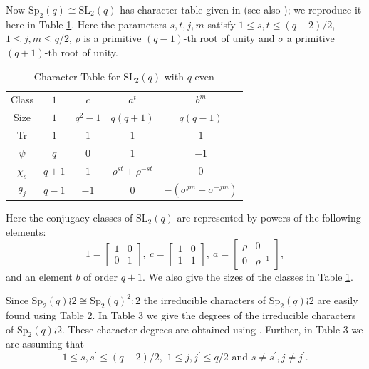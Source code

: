\documentclass[10pt,a4paper]{amsart}
\theoremstyle{plain}
\theoremstyle{definition}
\numberwithin{equation}{section}
\begin{document}
Now $\mathrm{Sp}_{2}(q) \cong \mathrm{SL}_2(q)$ has  character table  given in \cite{Dor}  (see also  \cite {GH}); we reproduce it here in Table \ref{sleven}.
Here the parameters $s,t,j,m$ satisfy $1\leq s, t \leq (q-2)/2$, $1\leq j, m \leq q/2$,  $\rho$ is a primitive $(q-1)$-th root of unity and $\sigma$ a primitive $(q+1)$-th root of unity. 

\begin{table}[h!]
\centering
\caption{Character Table for $\mathrm{SL}_{2}(q)$ with $q$ even}
\label{sleven}
\vspace{5pt}
\begin{tabular}{c|cccc}
Class & $1$ & $c$ & $a^t$ & $b^m$\\
Size & $1$ & $q^2-1$ & $q(q+1)$ & $q(q-1)$\\
\hline
 Tr & $1$ & $1$ & $1$ & $1$\\
$\psi$ & $q$ & $0$ & $1$ & $-1$\\
$\chi_s$ & $q+1$ & $1$ & $\rho^{st}+\rho^{-st}$ & $0$\\
$\theta_j$ & $q-1$ & $-1$ & $0$ & $-(\sigma^{jm}+\sigma^{-jm})$\\
\end{tabular}
\end{table}

Here the conjugacy classes of SL$_2(q)$ are represented by powers of the following elements:
$$
1 = \begin{bmatrix}
1 & 0\\
0 & 1
\end{bmatrix},\ 
c=\begin{bmatrix}
1 & 0\\
1 & 1
\end{bmatrix},\ 
a=\begin{bmatrix}
\rho & 0\\
0 & \rho^{-1}
\end{bmatrix},
$$
and an element $b$ of order $q+1$. We also give the sizes of the classes in Table \ref{sleven}.

Since $\mathrm{Sp}_2(q)\wr 2 \cong \mathrm{Sp}_2(q)^2\colon 2$
  the irreducible characters of $\mathrm{Sp}_2(q)\wr 2$ are easily found using Table 2.
In Table 
   3 we give the degrees of the irreducible characters of $\mathrm{Sp}_2(q)\wr 2$.
These character degrees are obtained using \cite[Proposition $20.9$, Theorem $19.18$]{JaL}. Further, in Table 
 3 we are assuming that  
 $$1 \leq s, s^\prime \leq (q-2)/2, \,\,1 \leq j, j^\prime \leq q/2 \text { and } s\neq s^\prime,j\neq j^\prime.
 $$ 
\end{document}
